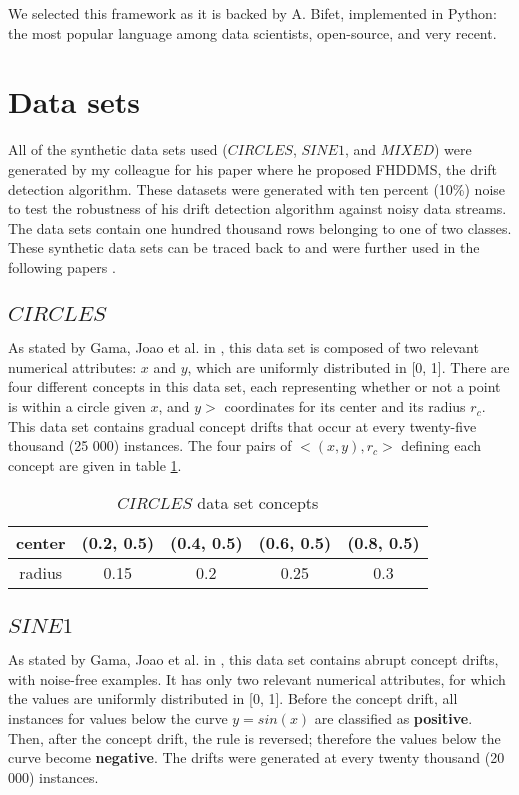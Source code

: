 We selected this framework as it is backed by A. Bifet, implemented in Python: the most popular language among data scientists, open-source, and very recent.

\section{Data sets}
All of the synthetic data sets used ($CIRCLES$, $SINE1$, and $MIXED$) were generated by my colleague for his paper \cite{pesaranghader2016fast} where he proposed FHDDMS, the drift detection algorithm. These datasets were generated with ten percent (10\%) noise to test the robustness of his drift detection algorithm against noisy data streams. The data sets contain one hundred thousand rows belonging to one of two classes. These synthetic data sets can be traced back to \cite{10.1007/3-540-59286-5_74} and were further used in the following papers \cite{nishida2007detecting, gama2004learning, baena2006early}. %

\subsection{$CIRCLES$}
As stated by Gama, Joao et al. in \cite{gama2004learning}, this data set is composed of two relevant numerical attributes: $x$ and $y$, which are uniformly distributed in [0, 1]. There are four different concepts in this data set, each representing whether or not a point is within a circle given $x$, and $y>$ coordinates for its center and its radius $r_c$. This data set contains gradual concept drifts that occur at every twenty-five thousand (25 000) instances. The four pairs of $<(x,y), r_c>$ defining each concept are given in table \ref{table:circle_concepts}.

\begin{table}[]
\centering
\caption{\label{table:circle_concepts}$CIRCLES$ data set concepts}
\begin{tabular}{|c|c|c|c|c|}
\hline
center & (0.2, 0.5) & (0.4, 0.5) & (0.6, 0.5) & (0.8, 0.5) \\ \hline
radius & 0.15       & 0.2        & 0.25       & 0.3        \\ \hline
\end{tabular}
\end{table}

\subsection{$SINE1$}
As stated by Gama, Joao et al. in \cite{gama2004learning}, this data set contains abrupt concept drifts, with noise-free examples. It has only two relevant numerical attributes, for which the values are uniformly distributed in [0, 1]. Before the concept drift, all instances for values below the curve $y = sin(x)$ are classified as \textbf{positive}. Then, after the concept drift, the rule is reversed; therefore the values below the curve become \textbf{negative}. The drifts were generated at every twenty thousand (20 000) instances.

